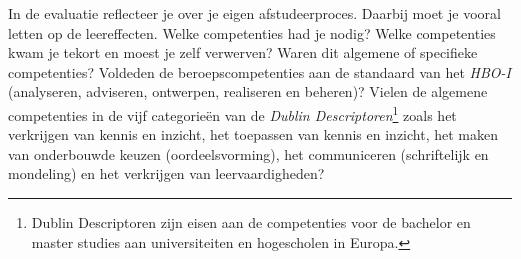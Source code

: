 
In de evaluatie reflecteer je over je eigen afstudeerproces. Daarbij
moet je vooral letten op de leereffecten. Welke competenties had je
nodig? Welke competenties kwam je tekort en moest je zelf verwerven?
Waren dit algemene of specifieke competenties?  Voldeden de
beroepscompetenties aan de standaard van het \emph{HBO-I} (analyseren,
adviseren, ontwerpen, realiseren en beheren)?  Vielen de algemene
competenties in de vijf categorieën van de \emph{Dublin
Descriptoren}\footnote{Dublin Descriptoren zijn eisen aan de
competenties voor de bachelor en master studies aan universiteiten en
hogescholen in Europa.} zoals het verkrijgen van kennis en inzicht,
het toepassen van kennis en inzicht, het maken van onderbouwde keuzen
(oordeelsvorming), het communiceren (schriftelijk en mondeling) en het
verkrijgen van leervaardigheden?

